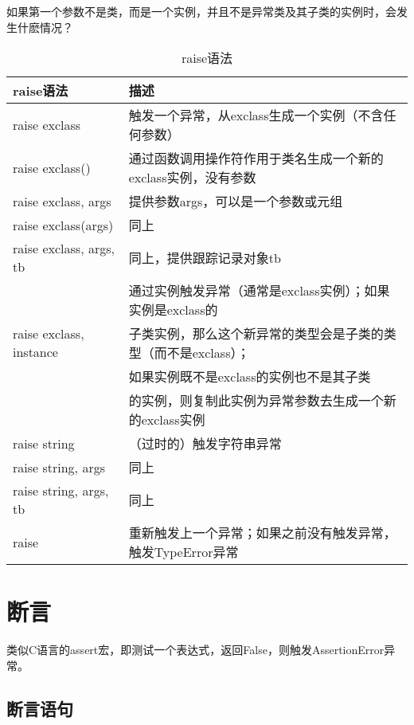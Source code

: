 \documentclass[11pt,a4paper]{article}
\begin{document}
\begin{CJK*}{UTF8}{nsung}
如果第一个参数不是类，而是一个实例，并且不是异常类及其子类的实例时，会发生什麽情况？ 
\begin{center}
\begin{table}[!hbp]
\caption{raise语法}
\begin{tabular}{|l|l|}
\hline
raise语法                         & 描述\\
\hline
raise exclass                     & 触发一个异常，从exclass生成一个实例（不含任何参数）\\
\hline
raise exclass()                   & 通过函数调用操作符作用于类名生成一个新的exclass实例，没有参数\\
\hline
raise exclass, args               & 提供参数args，可以是一个参数或元组\\
\hline
raise exclass(args)               & 同上\\
\hline
raise exclass, args, tb           & 同上，提供跟踪记录对象tb\\
\hline
                                  & 通过实例触发异常（通常是exclass实例）；如果实例是exclass的\\
raise exclass, instance           & 子类实例，那么这个新异常的类型会是子类的类型（而不是exclass）；\\
                                  & 如果实例既不是exclass的实例也不是其子类\\
                                  & 的实例，则复制此实例为异常参数去生成一个新的exclass实例\\
\hline
raise string                      & （过时的）触发字符串异常\\
\hline
raise string, args                & 同上\\
\hline
raise string, args, tb            & 同上\\
\hline
raise                             & 重新触发上一个异常；如果之前没有触发异常，触发TypeError异常\\
\hline
\end{tabular}
\end{table}
\end{center}
\newpage

\section{断言}

类似C语言的assert宏，即测试一个表达式，返回False，则触发AssertionError异常。

\subsection{断言语句}


\end{CJK*}
\end{document}
